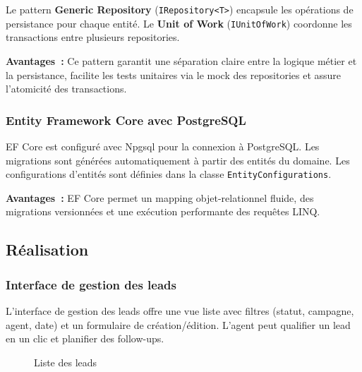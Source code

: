 Le pattern \textbf{Generic Repository} (\texttt{IRepository<T>}) encapsule les opérations
de persistance pour chaque entité. Le \textbf{Unit of Work} (\texttt{IUnitOfWork})
coordonne les transactions entre plusieurs repositories.

\textbf{Avantages~:} Ce pattern garantit une séparation claire entre la logique métier et
la persistance, facilite les tests unitaires via le mock des repositories et assure
l'atomicité des transactions.

\subsubsection{Entity Framework Core avec PostgreSQL}

EF Core est configuré avec Npgsql pour la connexion à PostgreSQL. Les migrations sont
générées automatiquement à partir des entités du domaine. Les configurations d'entités
sont définies dans la classe \texttt{EntityConfigurations}.

\textbf{Avantages~:} EF Core permet un mapping objet-relationnel fluide, des migrations
versionnées et une exécution performante des requêtes LINQ.

\subsection{Réalisation}
\label{subsec:sprint2_realisation}

\subsubsection{Interface de gestion des leads}

L'interface de gestion des leads offre une vue liste avec filtres (statut, campagne, agent,
date) et un formulaire de création/édition. L'agent peut qualifier un lead en un clic et
planifier des follow-ups.

\begin{figure}[H]
    \centering
    \caption{Liste des leads}
    \label{fig:sprint2_leads_list}
\end{figure}

